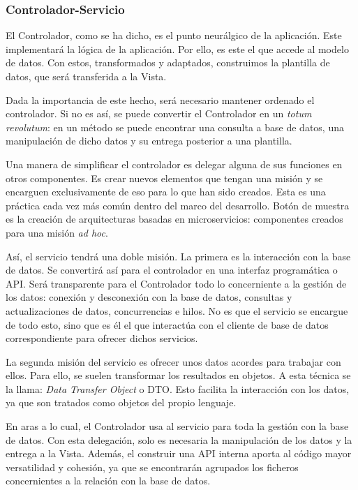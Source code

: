 \subsubsection{Controlador-Servicio}
El Controlador, como se ha dicho, es el punto neurálgico de la aplicación. Este implementará la lógica de la aplicación. Por ello, es este el que accede al modelo de datos. Con estos, transformados y adaptados, construimos la plantilla de datos, que será transferida a la Vista.

Dada la importancia de este hecho, será necesario mantener ordenado el controlador. Si no es así, se puede convertir el Controlador en un \textit{totum revolutum}: en un método se puede encontrar una consulta a base de datos, una manipulación de dicho datos y su entrega posterior a una plantilla.

Una manera de simplificar el controlador es delegar alguna de sus funciones en otros componentes. Es crear nuevos elementos que tengan una misión y se encarguen exclusivamente de eso para lo que han sido creados. Esta es una práctica cada vez más común dentro del marco del desarrollo. Botón de muestra es la creación de arquitecturas basadas en microservicios: componentes creados para una misión \textit{ad hoc}.

Así, el servicio tendrá una doble misión. La primera es la interacción con la base de datos. Se convertirá así para el controlador en una interfaz programática o API. Será transparente para el Controlador todo lo concerniente a la gestión de los datos: conexión y desconexión con la base de datos, consultas y actualizaciones de datos, concurrencias e hilos. No es que el servicio se encargue de todo esto, sino que es él el que interactúa con el cliente de base de datos correspondiente para ofrecer dichos servicios.

La segunda misión del servicio es ofrecer unos datos acordes para trabajar con ellos. Para ello, se suelen transformar los resultados en objetos. A esta técnica se la llama: \textit{Data Transfer Object} o DTO. Esto facilita la interacción con los datos, ya que son tratados como objetos del propio lenguaje.

En aras a lo cual, el Controlador usa al servicio para toda la gestión con la base de datos. Con esta delegación, solo es necesaria la manipulación de los datos y la entrega a la Vista. Además, el construir una API interna aporta al código mayor versatilidad y cohesión, ya que se encontrarán agrupados los ficheros concernientes a la relación con la base de datos.

